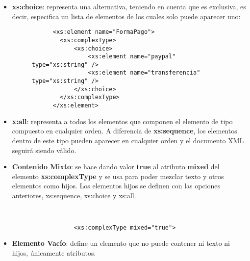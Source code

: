 \begin{itemize}
\begin{itemize}
       \item \textbf{xs:choice}: representa una alternativa, teniendo en cuenta que es exclusiva, es decir, especifica un lista de elementos de los cuales solo puede aparecer uno:

       \begin{figure}[H]
           \begin{tcolorbox}[sharp corners, colback=yellow!30, colframe=white!20]
               \scriptsize
               \begin{verbatim}
      <xs:element name="FormaPago">
        <xs:complexType>
            <xs:choice>
                <xs:element name="paypal" type="xs:string" />
                <xs:element name="transferencia" type="xs:string" />
            </xs:choice>
        </xs:complexType>
      </xs:element>
               \end{verbatim}
           \end{tcolorbox}
       \end{figure}

   \item \textbf{x:all}: representa a todos los elementos que componen el elemento de tipo compuesto  en cualquier orden. A diferencia de \textbf{xs:sequence}, los elementos dentro de este tipo pueden aparecer en cualquier orden y el documento XML seguirá siendo válido.

   \item \textbf{Contenido Mixto}: se hace dando valor \textbf{true} al atributo \textbf{mixed} del elemento \textbf{xs:complexType} y se usa para poder mezclar texto y otros elementos como hijos. Los elementos hijos se definen con las opciones anteriores, xs:sequence, xs:choice y xs:all.

       \begin{figure}[h]
           \begin{tcolorbox}[sharp corners, colback=yellow!30, colframe=white!20]
               \scriptsize
               \begin{verbatim}


            <xs:complexType mixed="true">
               \end{verbatim}
           \end{tcolorbox}
       \end{figure}

    \item \textbf{Elemento Vacío}: define un elemento que no puede contener ni texto ni hijos, únicamente atributos.


\end{itemize}
\end{itemize}
